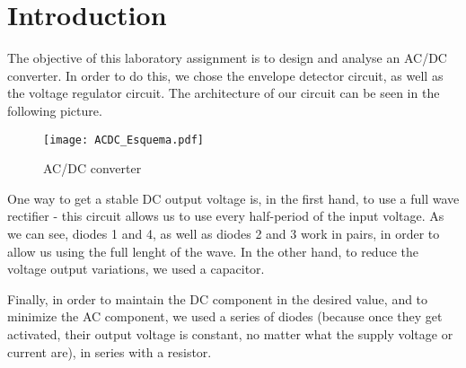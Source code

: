 \section{Introduction}
\label{sec:introduction}

\par The objective of this laboratory assignment is to design and analyse an AC/DC converter. In order to do this, we chose the envelope detector circuit, as well as the voltage regulator circuit. The architecture of our circuit can be seen in the following picture.

\begin{figure}[h!] \centering
\texttt{[image: ACDC\_Esquema.pdf]}
\caption{AC/DC converter}
\label{fig:AC/DC_Scheme}
\end{figure}

\par One way to get a stable DC output voltage is, in the first hand, to use a full wave rectifier - this circuit allows us to use every half-period of the input voltage. As we can see, diodes 1 and 4, as well as diodes 2 and 3 work in pairs, in order to allow us using the full lenght of the wave. In the other hand, to reduce the voltage output variations, we used a capacitor.
\par Finally, in order to maintain the DC component in the desired value, and to minimize the AC component, we used a series of diodes (because once they get activated, their output voltage is constant, no matter what the supply voltage or current are), in series with a resistor.

\newpage
